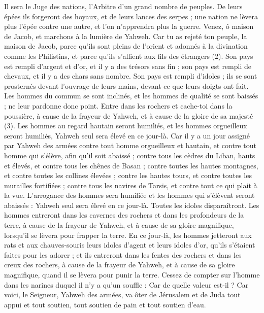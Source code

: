 \begin{multicols}{2}
Il sera le Juge des nations, l’Arbitre d’un grand nombre de peuples. De leurs épées ils forgeront des hoyaux, et de leurs lances des serpes ; une nation ne lèvera plus l'épée contre une autre, et l’on n’apprendra plus la guerre.
Venez, ô maison de Jacob, et marchons à la lumière de Yahweh.
Car tu as rejeté ton peuple, la maison de Jacob, parce qu'ils sont pleins de l’orient et adonnés à la divination comme les Philistins, et parce qu’ils s’allient aux fils des étrangers (2).
Son pays est rempli d'argent et d'or, et il y a des trésors sans fin ; son pays est rempli de chevaux, et il y a des chars sans nombre.
Son pays est rempli d'idoles ; ils se sont prosternés devant l'ouvrage de leurs mains, devant ce que leurs doigts ont fait.
Les hommes du commun se sont inclinés, et les hommes de qualité se sont baissés ; ne leur pardonne donc point.
Entre dans les rochers et cache-toi dans la poussière, à cause de la frayeur de Yahweh, et à cause de la gloire de sa majesté (3).
Les hommes au regard hautain seront humiliés, et les hommes orgueilleux seront humiliés, Yahweh seul sera élevé en ce jour-là.
Car il y a un jour assigné par Yahweh des armées contre tout homme orgueilleux et hautain, et contre tout homme qui s'élève, afin qu’il soit abaissé ;
contre tous les cèdres du Liban, hauts et élevés, et contre tous les chênes de Basan ;
contre toutes les hautes montagnes, et contre toutes les collines élevées ;
contre les hautes tours, et contre toutes les murailles fortifiées ;
contre tous les navires de Tarsis, et contre tout ce qui plait à la vue.
L’arrogance des hommes sera humiliée et les hommes qui s'élèvent seront abaissés :
Yahweh seul sera élevé en ce jour-là. Toutes les idoles disparaîtront.
Les hommes entreront dans les cavernes des rochers et dans les profondeurs de la terre, à cause de la frayeur de Yahweh, et à cause de sa gloire magnifique, lorsqu'il se lèvera pour frapper la terre.
En ce jour-là, les hommes jetteront aux rats et aux chauves-souris leurs idoles d’agent et leurs idoles d’or, qu’ils s’étaient faites pour les adorer ;
et ils entreront dans les fentes des rochers et dans les creux des rochers, à cause de la frayeur de Yahweh, et à cause de sa gloire magnifique, quand il se lèvera pour punir la terre.
Cessez de compter sur l'homme dans les narines duquel il n’y a qu’un souffle : Car de quelle valeur est-il ?
\VerseOne{}Car voici, le Seigneur, Yahweh des armées, va ôter de Jérusalem et de Juda tout appui et tout soutien, tout soutien de pain et tout soutien d'eau.

\end{multicols}
